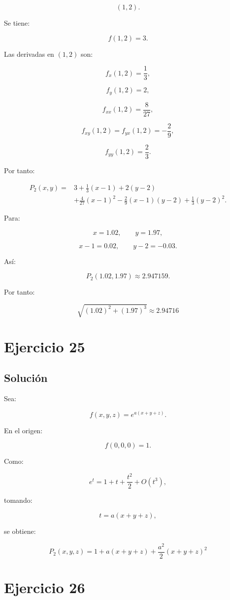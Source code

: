 \documentclass[11pt,a4paper]{article}
\begin{document}
\[
(1,2).
\]

Se tiene:

\[
f(1,2)=3.
\]

Las derivadas en \((1,2)\) son:

\[
f_x(1,2)=\frac13,
\]

\[
f_y(1,2)=2,
\]

\[
f_{xx}(1,2)=\frac8{27},
\]

\[
f_{xy}(1,2)=f_{yx}(1,2)=-\frac29,
\]

\[
f_{yy}(1,2)=\frac23.
\]

Por tanto:

\[
\boxed{
\begin{aligned}
P_2(x,y)
={}&
3
+
\frac13(x-1)
+
2(y-2)\\
&+
\frac4{27}(x-1)^2
-
\frac29(x-1)(y-2)
+
\frac13(y-2)^2.
\end{aligned}
}
\]

Para:

\[
x=1.02,
\qquad
y=1.97,
\]

\[
x-1=0.02,
\qquad
y-2=-0.03.
\]

Así:

\[
P_2(1.02,1.97)
\approx
2.947159.
\]

Por tanto:

\[
\boxed{
\sqrt{(1.02)^2+(1.97)^3}
\approx
2.94716
}
\]

\section{Ejercicio 25}
\subsection{Solución}

Sea:

\[
f(x,y,z)
=
e^{a(x+y+z)}.
\]

En el origen:

\[
f(0,0,0)=1.
\]

Como:

\[
e^t
=
1+t+\frac{t^2}{2}+O(t^3),
\]

tomando:

\[
t=a(x+y+z),
\]

se obtiene:

\[
\boxed{
P_2(x,y,z)
=
1
+
a(x+y+z)
+
\frac{a^2}{2}(x+y+z)^2
}
\]

\section{Ejercicio 26}
\end{document}
